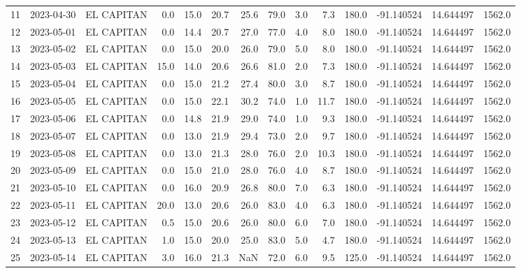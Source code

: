 \documentclass[12pt]{article}
\begin{document}
\begin{center}
\begin{tabular}{lllrrrrrrrrrrr}
11  & 2023-04-30 &  EL CAPITAN &     0.0 &  15.0 &   20.7 &  25.6 &     79.0 &  3.0 &         7.3 &       180.0 & -91.140524 &  14.644497 &   1562.0 \\
12  & 2023-05-01 &  EL CAPITAN &     0.0 &  14.4 &   20.7 &  27.0 &     77.0 &  4.0 &         8.0 &       180.0 & -91.140524 &  14.644497 &   1562.0 \\
13  & 2023-05-02 &  EL CAPITAN &     0.0 &  15.0 &   20.0 &  26.0 &     79.0 &  5.0 &         8.0 &       180.0 & -91.140524 &  14.644497 &   1562.0 \\
14  & 2023-05-03 &  EL CAPITAN &    15.0 &  14.0 &   20.6 &  26.6 &     81.0 &  2.0 &         7.3 &       180.0 & -91.140524 &  14.644497 &   1562.0 \\
15  & 2023-05-04 &  EL CAPITAN &     0.0 &  15.0 &   21.2 &  27.4 &     80.0 &  3.0 &         8.7 &       180.0 & -91.140524 &  14.644497 &   1562.0 \\
16  & 2023-05-05 &  EL CAPITAN &     0.0 &  15.0 &   22.1 &  30.2 &     74.0 &  1.0 &        11.7 &       180.0 & -91.140524 &  14.644497 &   1562.0 \\
17  & 2023-05-06 &  EL CAPITAN &     0.0 &  14.8 &   21.9 &  29.0 &     74.0 &  1.0 &         9.3 &       180.0 & -91.140524 &  14.644497 &   1562.0 \\
18  & 2023-05-07 &  EL CAPITAN &     0.0 &  13.0 &   21.9 &  29.4 &     73.0 &  2.0 &         9.7 &       180.0 & -91.140524 &  14.644497 &   1562.0 \\
19  & 2023-05-08 &  EL CAPITAN &     0.0 &  13.0 &   21.3 &  28.0 &     76.0 &  2.0 &        10.3 &       180.0 & -91.140524 &  14.644497 &   1562.0 \\
20  & 2023-05-09 &  EL CAPITAN &     0.0 &  15.0 &   21.0 &  28.0 &     76.0 &  4.0 &         8.7 &       180.0 & -91.140524 &  14.644497 &   1562.0 \\
21  & 2023-05-10 &  EL CAPITAN &     0.0 &  16.0 &   20.9 &  26.8 &     80.0 &  7.0 &         6.3 &       180.0 & -91.140524 &  14.644497 &   1562.0 \\
22  & 2023-05-11 &  EL CAPITAN &    20.0 &  13.0 &   20.6 &  26.0 &     83.0 &  4.0 &         6.3 &       180.0 & -91.140524 &  14.644497 &   1562.0 \\
23  & 2023-05-12 &  EL CAPITAN &     0.5 &  15.0 &   20.6 &  26.0 &     80.0 &  6.0 &         7.0 &       180.0 & -91.140524 &  14.644497 &   1562.0 \\
24  & 2023-05-13 &  EL CAPITAN &     1.0 &  15.0 &   20.0 &  25.0 &     83.0 &  5.0 &         4.7 &       180.0 & -91.140524 &  14.644497 &   1562.0 \\
25  & 2023-05-14 &  EL CAPITAN &     3.0 &  16.0 &   21.3 &   NaN &     72.0 &  6.0 &         9.5 &       125.0 & -91.140524 &  14.644497 &   1562.0 \\
\bottomrule
\end{tabular}

        
        \end{center}
        
\end{document}
